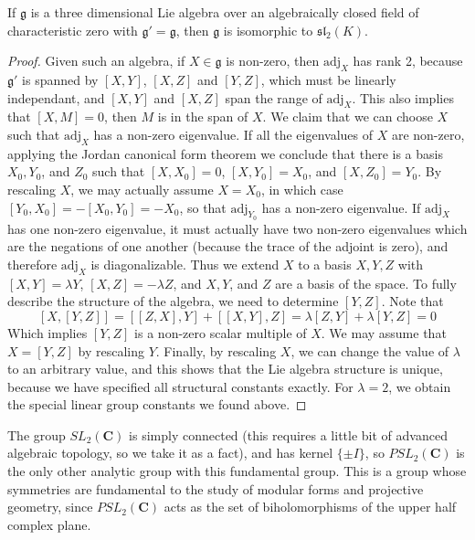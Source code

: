 \begin{theorem}
    If $\mathfrak{g}$ is a three dimensional Lie algebra over an algebraically closed field of characteristic zero with $\mathfrak{g}' = \mathfrak{g}$, then $\mathfrak{g}$ is isomorphic to $\mathfrak{sl}_2(K)$.
\end{theorem}
\begin{proof}
Given such an algebra, if $X \in \mathfrak{g}$ is non-zero, then $\text{adj}_X$ has rank 2, because $\mathfrak{g}'$ is spanned by $[X,Y]$, $[X,Z]$ and $[Y,Z]$, which must be linearly independant, and $[X,Y]$ and $[X,Z]$ span the range of $\text{adj}_X$. This also implies that $[X,M] = 0$, then $M$ is in the span of $X$. We claim that we can choose $X$ such that $\text{adj}_X$ has a non-zero eigenvalue. If all the eigenvalues of $X$ are non-zero, applying the Jordan canonical form theorem we conclude that there is a basis $X_0, Y_0$, and $Z_0$ such that $[X,X_0] = 0$, $[X,Y_0] = X_0$, and $[X,Z_0] = Y_0$. By rescaling $X$, we may actually assume $X = X_0$, in which case $[Y_0,X_0] = -[X_0,Y_0] = -X_0$, so that $\text{adj}_{Y_0}$ has a non-zero eigenvalue. If $\text{adj}_X$ has one non-zero eigenvalue, it must actually have two non-zero eigenvalues which are the negations of one another (because the trace of the adjoint is zero), and therefore $\text{adj}_X$ is diagonalizable. Thus we extend $X$ to a basis $X,Y,Z$ with $[X,Y] = \lambda Y$, $[X,Z] = -\lambda Z$, and $X,Y$, and $Z$ are a basis of the space. To fully describe the structure of the algebra, we need to determine $[Y,Z]$. Note that
%
\[ [X,[Y,Z]] = [[Z,X],Y] + [[X,Y],Z] = \lambda [Z,Y] + \lambda [Y,Z] = 0 \]
%
Which implies $[Y,Z]$ is a non-zero scalar multiple of $X$. We may assume that $X = [Y,Z]$ by rescaling $Y$. Finally, by rescaling $X$, we can change the value of $\lambda$ to an arbitrary value, and this shows that the Lie algebra structure is unique, because we have specified all structural constants exactly. For $\lambda = 2$, we obtain the special linear group constants we found above.
\end{proof}

The group $SL_2(\mathbf{C})$ is simply connected (this requires a little bit of advanced algebraic topology, so we take it as a fact), and has kernel $\{ \pm I \}$, so $PSL_2(\mathbf{C})$ is the only other analytic group with this fundamental group. This is a group whose symmetries are fundamental to the study of modular forms and projective geometry, since $PSL_2(\mathbf{C})$ acts as the set of biholomorphisms of the upper half complex plane.










